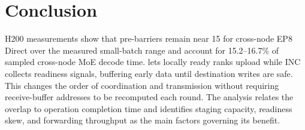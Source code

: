 \section{Conclusion}
H200 measurements show that pre-barriers remain near 15\us{} for cross-node EP8 Direct over the measured small-batch range and account for 15.2--16.7\% of sampled cross-node MoE decode time. \sys{} lets locally ready ranks upload while INC collects readiness signals, buffering early data until destination writes are safe. This changes the order of coordination and transmission without requiring receive-buffer addresses to be recomputed each round. The analysis relates the overlap to operation completion time and identifies staging capacity, readiness skew, and forwarding throughput as the main factors governing its benefit.
